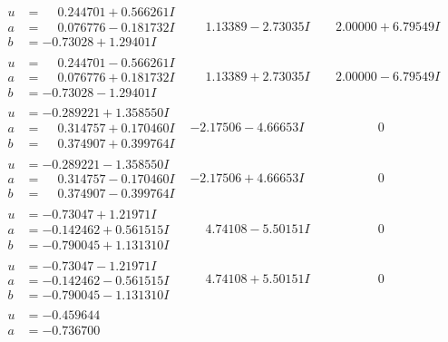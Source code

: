 \documentclass[1p]{elsarticle_modified}
\theoremstyle{definition}
\begin{document}
$$\begin{array}{c|c|c}
 \hline 
\begin{aligned}
u &= \phantom{-}0.244701 + 0.566261 I \\
a &= \phantom{-}0.076776 - 0.181732 I \\
b &= -0.73028 + 1.29401 I\end{aligned}
 & \phantom{-}1.13389 - 2.73035 I & \phantom{-}2.00000 + 6.79549 I \\ \hline\begin{aligned}
u &= \phantom{-}0.244701 - 0.566261 I \\
a &= \phantom{-}0.076776 + 0.181732 I \\
b &= -0.73028 - 1.29401 I\end{aligned}
 & \phantom{-}1.13389 + 2.73035 I & \phantom{-}2.00000 - 6.79549 I \\ \hline\begin{aligned}
u &= -0.289221 + 1.358550 I \\
a &= \phantom{-}0.314757 + 0.170460 I \\
b &= \phantom{-}0.374907 + 0.399764 I\end{aligned}
 & -2.17506 - 4.66653 I & \phantom{-0.000000 } 0 \\ \hline\begin{aligned}
u &= -0.289221 - 1.358550 I \\
a &= \phantom{-}0.314757 - 0.170460 I \\
b &= \phantom{-}0.374907 - 0.399764 I\end{aligned}
 & -2.17506 + 4.66653 I & \phantom{-0.000000 } 0 \\ \hline\begin{aligned}
u &= -0.73047 + 1.21971 I \\
a &= -0.142462 + 0.561515 I \\
b &= -0.790045 + 1.131310 I\end{aligned}
 & \phantom{-}4.74108 - 5.50151 I & \phantom{-0.000000 } 0 \\ \hline\begin{aligned}
u &= -0.73047 - 1.21971 I \\
a &= -0.142462 - 0.561515 I \\
b &= -0.790045 - 1.131310 I\end{aligned}
 & \phantom{-}4.74108 + 5.50151 I & \phantom{-0.000000 } 0 \\ \hline\begin{aligned}
u &= -0.459644\phantom{ +0.000000I} \\
a &= -0.736700\phantom{ +0.000000I} \\

\end{aligned}
\end{array}$$
\end{document}
